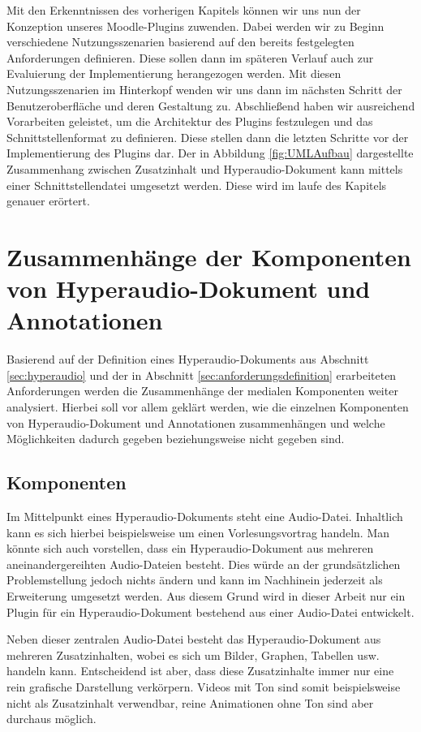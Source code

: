 Mit den Erkenntnissen des vorherigen Kapitels können wir uns nun der Konzeption unseres Moodle-Plugins zuwenden. Dabei werden wir zu Beginn verschiedene Nutzungsszenarien basierend auf den bereits festgelegten Anforderungen definieren. Diese sollen dann im späteren Verlauf auch zur Evaluierung der Implementierung herangezogen werden. Mit diesen Nutzungsszenarien im Hinterkopf wenden wir uns dann im nächsten Schritt der Benutzeroberfläche und deren Gestaltung zu. Abschließend haben wir ausreichend Vorarbeiten geleistet, um die Architektur des Plugins festzulegen und das Schnittstellenformat zu definieren. Diese stellen dann die letzten Schritte vor der Implementierung des Plugins dar.
Der in Abbildung \ref{fig:UMLAufbau} dargestellte Zusammenhang zwischen Zusatzinhalt und Hyperaudio-Dokument kann mittels einer Schnittstellendatei umgesetzt werden. Diese wird im laufe des Kapitels genauer erörtert.

\section{Zusammenhänge der Komponenten von Hyperaudio-Dokument und Annotationen}
Basierend auf der Definition eines Hyperaudio-Dokuments aus Abschnitt \ref{sec:hyperaudio} und der in Abschnitt \ref{sec:anforderungsdefinition} erarbeiteten Anforderungen werden die Zusammenhänge der medialen Komponenten weiter analysiert. Hierbei soll vor allem geklärt werden, wie die einzelnen Komponenten von Hyperaudio-Dokument und Annotationen zusammenhängen und welche Möglichkeiten dadurch gegeben beziehungsweise nicht gegeben sind.


\subsection{Komponenten}
Im Mittelpunkt eines Hyperaudio-Dokuments steht eine Audio-Datei. Inhaltlich kann es sich hierbei beispielsweise um einen Vorlesungsvortrag handeln. Man könnte sich auch vorstellen, dass ein Hyperaudio-Dokument aus mehreren aneinandergereihten Audio-Dateien besteht. Dies würde an der grundsätzlichen Problemstellung jedoch nichts ändern und kann im Nachhinein jederzeit als Erweiterung umgesetzt werden. Aus diesem Grund wird in dieser Arbeit nur ein Plugin für ein Hyperaudio-Dokument bestehend aus einer Audio-Datei entwickelt.

Neben dieser zentralen Audio-Datei besteht das Hyperaudio-Dokument aus mehreren Zusatzinhalten, wobei es sich um Bilder, Graphen, Tabellen usw. handeln kann. Entscheidend ist aber, dass diese Zusatzinhalte immer nur eine rein grafische Darstellung verkörpern. Videos mit Ton sind somit beispielsweise nicht als Zusatzinhalt verwendbar, reine Animationen ohne Ton sind aber durchaus möglich.

